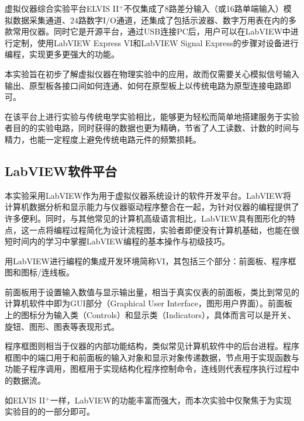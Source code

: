 \documentclass[UTF-8,twoside,cs4size]{ctexart}
\begin{document}
	虚拟仪器综合实验平台ELVIS II$ ^+ $不仅集成了8路差分输入（或16路单端输入）模拟数据采集通道、24路数字I/O通道，还集成了包括示波器、数字万用表在内的多款常用仪器。同时它是开源平台，通过USB连接PC后，用户可以在LabVIEW中进行定制，使用LabVIEW Express VI和LabVIEW Signal Express的步骤对设备进行编程，实现更多更强大的功能。	
	
	本实验旨在初步了解虚拟仪器在物理实验中的应用，故而仅需要关心模拟信号输入输出、原型板各接口间如何连通、如何在原型板上以传统电路为原型连接电路即可。
	
	在该平台上进行实验与传统电学实验相比，能够更为轻松而简单地搭建服务于实验者目的的实验电路，同时获得的数据也更为精确，节省了人工读数、计数的时间与精力，也能一定程度上避免传统电路元件的频繁损耗。
	
	\subsection{LabVIEW软件平台}
	本实验采用LabVIEW作为用于虚拟仪器系统设计的软件开发平台。LabVIEW将计算机数据分析和显示能力与仪器驱动程序整合在一起，为针对仪器的编程提供了许多便利。同时，与其他常见的计算机高级语言相比，LabVIEW具有图形化的特点，这一点将编程过程简化为设计流程图，实验者即便没有计算机基础，也能在很短时间内的学习中掌握LabVIEW编程的基本操作与初级技巧。
	
	用LabVIEW进行编程的集成开发环境简称VI，其包括三个部分：前面板、程序框图和图标/连线板。
	
	前面板用于设置输入数值与显示输出量，相当于真实仪表的前面板，类比到常见的计算机软件中即为GUI部分（Graphical User Interface，图形用户界面）。前面板上的图标分为输入类（Controls）和显示类（Indicators），具体而言可以是开关、旋钮、图形、图表等表现形式。
	
	程序框图则相当于仪器的内部功能结构，类似常见计算机软件中的后台进程。程序框图中的端口用于和前面板的输入对象和显示对象传递数据，节点用于实现函数与功能子程序调用，图框用于实现结构化程序控制命令，连线则代表程序执行过程中的数据流。
	
	如ELVIS II$ ^+ $一样，LabVIEW的功能丰富而强大，而本次实验中仅聚焦于为实现实验目的的一部分即可。
	
\end{document}
